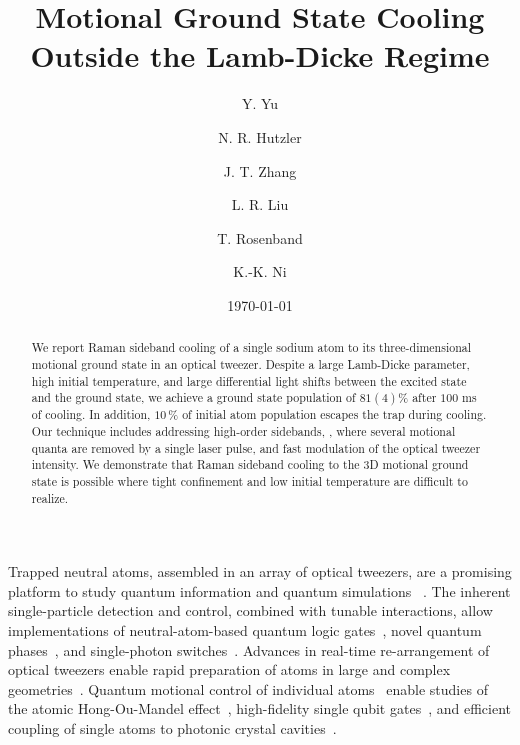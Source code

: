 \documentclass[aps,prl,twocolumn,groupedaddress]{revtex4-1}
\begin{document}
\title{Motional Ground State Cooling Outside the Lamb-Dicke Regime}
\author{Y. Yu}
\author{N. R. Hutzler}
\author{J. T. Zhang}
\author{L. R. Liu}
\author{T. Rosenband}
\author{K.-K. Ni}

\date{\today}

\begin{abstract}
  We report Raman sideband cooling of a single sodium atom to its three-dimensional
  motional ground state in an optical tweezer.
  Despite  a  large Lamb-Dicke parameter, high initial temperature, and
  large differential light shifts between the excited state and the ground state,
  we achieve a ground state population of $81(4)$\% after $100$ ms of cooling. In addition, $10\,\%$ of initial atom population escapes the trap during cooling.
  Our technique includes addressing  high-order sidebands, , where several motional quanta are removed by a single laser pulse,  and
  fast modulation of the optical tweezer intensity.
  We demonstrate that Raman sideband cooling to the 3D motional ground state is possible %
  where tight confinement and low initial temperature are difficult to realize.
\end{abstract}

\maketitle


Trapped neutral atoms, assembled  in an array of optical tweezers, are a promising  platform to study quantum information and quantum simulations~
\cite{Schlosser2001,Weiss2004,Isenhower2010,Wilk2010,Kaufman2015,Labuhn2016,Murmann2015}.
The inherent single-particle detection and control, combined with tunable interactions,
allow implementations of neutral-atom-based quantum logic gates~\cite{Isenhower2010,Wilk2010},
novel quantum phases~\cite{Labuhn2016}, and single-photon switches~\cite{Dayan2008,Tiecke2014}.
Advances in real-time re-arrangement of optical tweezers enable rapid preparation of atoms
in large and complex geometries~\cite{Barredo2016,Endres2016}.
Quantum motional control of individual
atoms~\cite{Li2012,Kaufman2012,Thompson2013,Liu2017,Robens2017} enable
studies of the atomic Hong-Ou-Mandel effect~\cite{Kaufman2014},
high-fidelity single qubit gates~\cite{Wang2016},
and efficient coupling of single atoms to photonic crystal cavities~\cite{Thompson2013a}.
\end{document}
